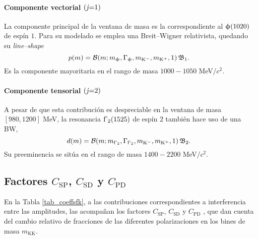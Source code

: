\paragraph{Componente vectorial $\text{(\textit{j}}\text{=}\text{1)}$}
La componente principal de la ventana de masa es la correspondiente al $\upphi(1020)$ de espín $1$. Para su modelado se emplea una Breit--Wigner relativista, quedando su \emph{line--shape}
\begin{equation}
	p(m) = \mathcal{B}(m;m_{\upphi},\Gamma_{\upphi},m_{\text{K}{}^{-}},m_{\text{K}{}^{+}},1) \, \mathfrak{B}_1.
\end{equation}
Es la componente mayoritaria en el rango de masa $1000-1050$ MeV$/c^2$.


\paragraph{Componente tensorial $\text{(\textit{j}}\text{=}\text{2)}$}
A pesar de que esta contribución es despreciable en la ventana de masa $[980,1200]$ MeV, la resonancia $\text{f'}_2(1525)$ de espín $2$ también hace uso de una BW,
\begin{equation}
	d(m) = \mathcal{B}(m;m_{\text{f'}_2},\Gamma_{\text{f'}_2},m_{\text{K}{}^{-}},m_{\text{K}{}^{+}},1) \, \mathfrak{B}_2.
\end{equation}
Su preeminencia se sitúa en el rango de masa $1400-2200$ MeV$/c^2$.





\subsection{Factores 
\texorpdfstring{$\textit{C}_{\text{SP}}$}{CSP}, \texorpdfstring{$\textit{C}_{\text{SD}}$}{CSD} y \texorpdfstring{$\textit{C}_{\text{PD}}$}{CPD}
}

\label{sec_factorescspcspdcssd}

En la Tabla \ref{tab_coeffsfk}, a las contribuciones correspondientes a interferencia entre las amplitudes, las acompañan los factores $C_{\text{SP}}$, $C_{\text{SD}}$ y $C_{\text{PD}}$ , que dan cuenta del cambio relativo de fracciones de las diferentes polarizaciones en los bines de masa $m_{\text{KK}}$.

